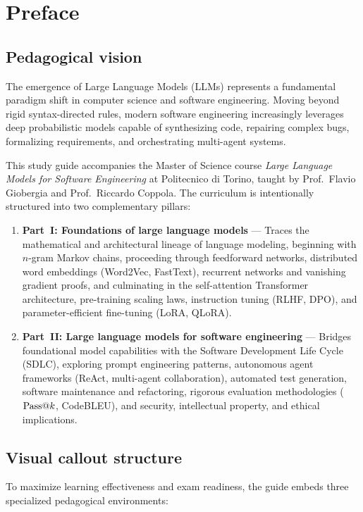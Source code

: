 \documentclass[../main.tex]{subfiles}
\begin{document}
\chapter*{Preface}

\section*{Pedagogical vision}
The emergence of Large Language Models (LLMs) represents a fundamental paradigm shift in computer science and software engineering. Moving beyond rigid syntax-directed rules, modern software engineering increasingly leverages deep probabilistic models capable of synthesizing code, repairing complex bugs, formalizing requirements, and orchestrating multi-agent systems.

This study guide accompanies the Master of Science course \emph{Large Language Models for Software Engineering} at Politecnico di Torino, taught by Prof.~Flavio Giobergia and Prof.~Riccardo Coppola. The curriculum is intentionally structured into two complementary pillars:
\begin{enumerate}
    \item \textbf{Part~I: Foundations of large language models} --- Traces the mathematical and architectural lineage of language modeling, beginning with $n$-gram Markov chains, proceeding through feedforward networks, distributed word embeddings (Word2Vec, FastText), recurrent networks and vanishing gradient proofs, and culminating in the self-attention Transformer architecture, pre-training scaling laws, instruction tuning (RLHF, DPO), and parameter-efficient fine-tuning (LoRA, QLoRA).
    \item \textbf{Part~II: Large language models for software engineering} --- Bridges foundational model capabilities with the Software Development Life Cycle (SDLC), exploring prompt engineering patterns, autonomous agent frameworks (ReAct, multi-agent collaboration), automated test generation, software maintenance and refactoring, rigorous evaluation methodologies ($\mathrm{Pass}@k$, CodeBLEU), and security, intellectual property, and ethical implications.
\end{enumerate}

\section*{Visual callout structure}
To maximize learning effectiveness and exam readiness, the guide embeds three specialized pedagogical environments:
\end{document}
